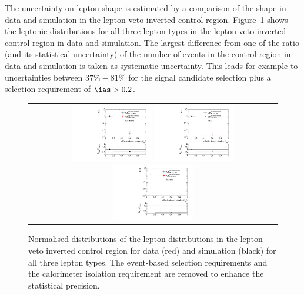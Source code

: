 The uncertainty on lepton \ias shape is estimated by a comparison of the \ias shape in data and simulation in the lepton veto inverted control region.
Figure~\ref{fig:LeptonIasUnc} shows the leptonic \ias distributions for all three lepton types in the lepton veto inverted control region in data and simulation.
The largest difference from one  of the ratio (and its statistical uncertainty) of the number of events in the control region in data and simulation is taken as systematic uncertainty.
This leads for example to uncertainties between $37\%-81\%$ for the signal candidate selection plus a selection requirement of $\ias>0.2$.
\begin{figure}[!h]
  \centering 
  \begin{tabular}{c}
    \includegraphics[width=0.33\textwidth]{figures/analysis/Background/hASmi_SRbinning_Electrons_MCCR_DataCR.pdf}
    \includegraphics[width=0.33\textwidth]{figures/analysis/Background/hASmi_SRbinning_Taus_MCCR_DataCR.pdf}
    \includegraphics[width=0.33\textwidth]{figures/analysis/Background/hASmi_SRbinning_Muons_MCCR_DataCR.pdf}
  \end{tabular}
  \caption{Normalised distributions of the lepton \ias distributions in the lepton veto inverted control region for data (red) and simulation (black) for all three lepton types. 
           The event-based selection requirements and the calorimeter isolation requirement are removed to enhance the statistical precision.}
  \label{fig:LeptonIasUnc}
\end{figure}

